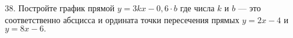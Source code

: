 38. Постройте график прямой $y=3kx-0,6\cdot b$ где числа $k$ и $b$ --- это соответственно абсцисса и ордината точки пересечения прямых $y=2x-4$ и $y=8x-6.$\\
